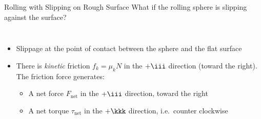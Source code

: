 \documentclass[12pt,compress,aspectratio=169]{beamer}
\begin{document}
\begin{frame}{Rolling with Slipping on Rough Surface}
  What if the rolling sphere is slipping against the surface?
  \begin{columns}
    \centering

    \begin{itemize}
    \item Slippage at the point of contact between the sphere and the flat
      surface
    \item There is \emph{kinetic} friction $f_k=\mu_kN$ in the $+\iii$
      direction (toward the right). The friction force generates:
      \begin{itemize}
      \item A net force $F_\text{net}$ in the $+\iii$ direction, toward the
        right
      \item A net torque $\tau_\text{net}$ in the $+\kkk$ direction, i.e.\
        counter clockwise
      \end{itemize}
    \end{itemize}
  \end{columns}
\end{frame}
\end{document}
